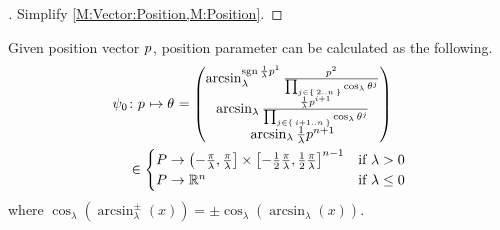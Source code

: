 \documentclass[../main.tex]{subfiles}
\begin{document}
\begin{proof}[]
Simplify \cref{M:Vector:Position,M:Position}.
\end{proof}
\begin{lemma}\label{M:Parameter:Value}
Given position vector \(\tensor{p}{}\), position parameter can be calculated as the following.
\begin{align*}
\psi_0
&\colon\tensor{p}{}\mapsto\tensor{\theta}{}
=
\begin{pmatrix}
\arcsin_\lambda^{\sign{\frac{1}{\lambda}\tensor{p}{^1}}}{\frac{\tensor{p}{^2}}{\prod_{j\in\Set{2..n}}{\cos_\lambda{\tensor{\theta}{^j}}}}}\\
\arcsin_\lambda{\frac{\frac{1}{\lambda}\tensor{p}{^{i+1}}}{\prod_{j\in\Set{i+1..n}}{\cos_\lambda{\tensor{\theta}{^j}}}}}\\
\arcsin_\lambda{\frac{1}{\lambda}\tensor{p}{^{n+1}}}\\
\end{pmatrix}\\
&\in
\begin{cases}
P\to\left(-\frac{\pi}{\lambda},\frac{\pi}{\lambda}\right]\times\left[-\frac{1}{2}\frac{\pi}{\lambda},\frac{1}{2}\frac{\pi}{\lambda}\right]^{n-1}&\text{if \(\lambda>0\)}\\
P\to\R^{n}&\text{if \(\lambda\le0\)}\\
\end{cases}
\end{align*}
where \(\cos_\lambda\left(\arcsin_\lambda^{\pm}\left(x\right)\right) =\pm\cos_\lambda\left(\arcsin_\lambda\left(x\right)\right)\).
\end{lemma}
\end{document}

